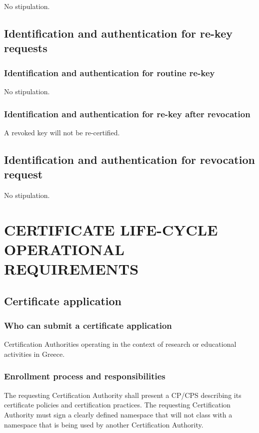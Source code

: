 \documentclass[11pt,a4paper,titlepage]{book}
\begin{document}
No stipulation. 

\section{Identification and authentication for re-key requests}
\subsection{Identification and authentication for routine re-key}

No stipulation.

\subsection{Identification and authentication for re-key after revocation}

A revoked key will not be re-certified.

\section{Identification and authentication for revocation request}

No stipulation.

\chapter{CERTIFICATE LIFE-CYCLE OPERATIONAL REQUIREMENTS}
\section{Certificate application}
\subsection{Who can submit a certificate application}

Certification Authorities operating in the context of research or educational activities in Greece.

\subsection{Enrollment process and responsibilities}

The requesting Certification Authority shall present a CP/CPS describing its certificate policies and certification practices. The requesting Certification Authority must sign a clearly defined namespace that will not class with a namespace that is being used by another Certification Authority.
\end{document}
